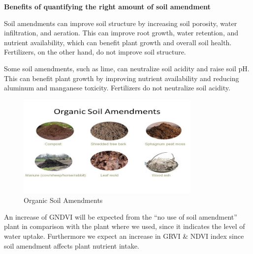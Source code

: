 \documentclass{article}
\begin{document}
{                \textbf{Benefits of quantifying the right amount of soil amendment }\par
                Soil amendments can improve soil structure by increasing soil porosity, water infiltration, and aeration. This can improve root growth, water retention, and nutrient availability, which can benefit plant growth and overall soil health. Fertilizers, on the other hand, do not improve soil structure.\par
                Some soil amendments, such as lime, can neutralize soil acidity and raise soil pH. This can benefit plant growth by improving nutrient availability and reducing aluminum and manganese toxicity. Fertilizers do not neutralize soil acidity.
                \par
                \begin{figure}[h]
                    \centering
                    \includegraphics[width=0.8\textwidth]{Figures/soil.jpg}
                    \caption{Organic Soil Amendments}
                    \label{fig:my_label}
                \end{figure}
                \newpage
                
                An increase of GNDVI will be expected from the “no use of soil amendment” plant in comparison with the plant where we used, since it indicates the level of water uptake. Furthermore we expect an increase in GRVI & NDVI index since soil amendment affects plant nutrient intake. 
                
}
\end{document}
